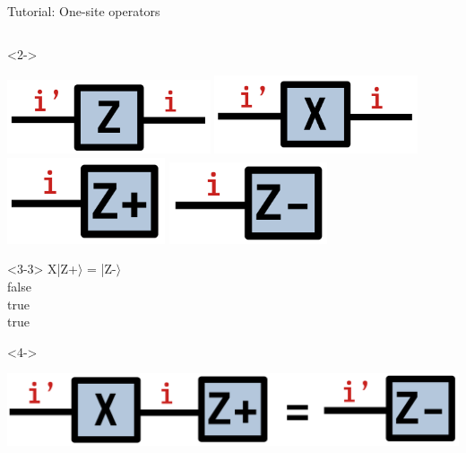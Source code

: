 \begin{frame}[fragile]{Tutorial: One-site operators}
\begin{columns}
\begin{column}{4.5cm}
\begin{onlyenv}<2->
\begin{center}
\includegraphics[width=0.45\textwidth]{
  slides/assets/Z.png
}
\includegraphics[width=0.45\textwidth]{
  slides/assets/X.png
} \\
\vspace*{0.5cm}
\includegraphics[width=0.35\textwidth]{
  slides/assets/Zp.png
}
\includegraphics[width=0.35\textwidth]{
  slides/assets/Zm.png
}
\end{center}
\vspace*{0.1cm}
\end{onlyenv}

\begin{onlyenv}<3-3>
X|Z+$\rangle$ = |Z-$\rangle$ \\
false \\
true \\
true
\end{onlyenv}

\begin{onlyenv}<4->
\vspace*{0.3cm}
\begin{center}
\includegraphics[width=1.0\textwidth]{
  slides/assets/XZp.png
}
\end{center}
\vspace*{0.2cm}
\end{onlyenv}

\end{column}

\end{columns}

\end{frame}
